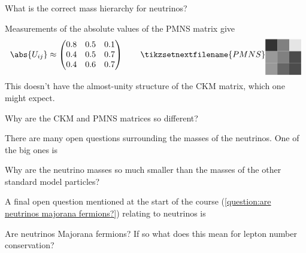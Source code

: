\documentclass[fleqn]{NotesClass}
\begin{document}
    \begin{openquestion}{}{}
        What is the correct mass hierarchy for neutrinos?
    \end{openquestion}
    
    Measurements of the absolute values of the PMNS matrix give
    \begin{equation}
        \abs{U_{ij}} \approx
        \begin{pmatrix}
            0.8 & 0.5 & 0.1\\
            0.4 & 0.5 & 0.7\\
            0.4 & 0.6 & 0.7
        \end{pmatrix}
        \qquad
        \tikzsetnextfilename{PMNS}
        \begin{tikzpicture}[baseline=(current bounding box)]
            \fill[black!40!white] (0, 0) rectangle (0.5, 0.5);
            \fill[black!60!white] (0.5, 0) rectangle (1, 0.5);
            \fill[black!70!white] (1, 0) rectangle (1.5, 0.5);
            \fill[black!40!white] (0, 0.5) rectangle (0.5, 1);
            \fill[black!50!white] (0.5, 0.5) rectangle (1, 1);
            \fill[black!70!white] (1, 0.5) rectangle (1.5, 1);
            \fill[black!80!white] (0, 1) rectangle (0.5, 1.5);
            \fill[black!50!white] (0.5, 1) rectangle (1, 1.5);
            \fill[black!10!white] (1, 1) rectangle (1.5, 1.5);
        \end{tikzpicture}
    \end{equation}
    This doesn't have the almost-unity structure of the CKM matrix, which one might expect.
    
    \begin{openquestion}{}{}
        Why are the CKM and PMNS matrices so different?
    \end{openquestion}
    
    There are many open questions surrounding the masses of the neutrinos.
    One of the big ones is
    \begin{openquestion}{}{}
        Why are the neutrino masses so much smaller than the masses of the other standard model particles?
    \end{openquestion}
    
    A final open question mentioned at the start of the course (\cref{question:are neutrinos majorana fermions?}) relating to neutrinos is
    \begin{openquestion}{}{}
        Are neutrinos Majorana fermions?
        If so what does this mean for lepton number conservation?
    \end{openquestion}
    
\end{document}
